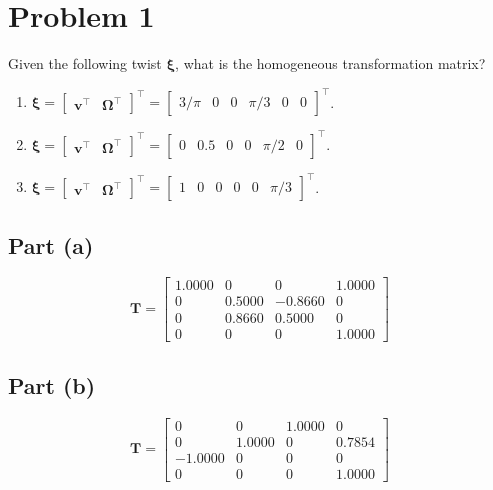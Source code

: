 \documentclass[11pt]{article}
\newcommand{\T}{\bm{T}}
\newcommand{\xivec}{\bm{\xi}}
\newcommand{\vvec}{\bm{v}}
\newcommand{\Omvec}{\bm{\Omega}}
\begin{document}
\section*{Problem 1}

\begin{statement}
Given the following twist $\xivec$, what is the homogeneous transformation matrix?
\begin{enumerate}[label=(\alph*), leftmargin=1.6em, itemsep=2pt]
    \item $\xivec = \begin{bmatrix}\vvec^{\intercal} & \Omvec^{\intercal}\end{bmatrix}^{\intercal} = \begin{bmatrix}3/\pi & 0 & 0 & \pi/3 & 0 & 0\end{bmatrix}^{\intercal}$.
    \item $\xivec = \begin{bmatrix}\vvec^{\intercal} & \Omvec^{\intercal}\end{bmatrix}^{\intercal} = \begin{bmatrix}0 & 0.5 & 0 & 0 & \pi/2 & 0\end{bmatrix}^{\intercal}$.
    \item $\xivec = \begin{bmatrix}\vvec^{\intercal} & \Omvec^{\intercal}\end{bmatrix}^{\intercal} = \begin{bmatrix}1 & 0 & 0 & 0 & 0 & \pi/3\end{bmatrix}^{\intercal}$.
\end{enumerate}
\end{statement}

\subsection*{Part (a)}
\begin{result}
\[
    \T = \begin{bmatrix}
        1.0000 & 0 & 0 & 1.0000\\
        0 & 0.5000 & -0.8660 & 0\\
        0 & 0.8660 & 0.5000 & 0\\
        0 & 0 & 0 & 1.0000
    \end{bmatrix}
\]
\end{result}

\subsection*{Part (b)}
\begin{result}
\[
    \T = \begin{bmatrix}
        0 & 0 & 1.0000 & 0\\
        0 & 1.0000 & 0 & 0.7854\\
        -1.0000 & 0 & 0 & 0\\
        0 & 0 & 0 & 1.0000
    \end{bmatrix}
\]
\end{result}
\end{document}
